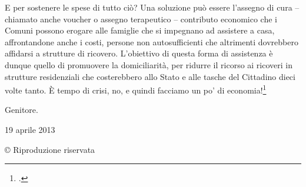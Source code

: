 E per sostenere le spese di tutto ciò? Una soluzione può essere l'assegno di cura – chiamato anche voucher o assegno terapeutico – contributo economico che i Comuni possono erogare alle famiglie che si impegnano ad assistere a casa, affrontandone anche i costi, persone non autosufficienti che altrimenti dovrebbero affidarsi a strutture di ricovero.
L'obiettivo di questa forma di assistenza è dunque quello di promuovere la domiciliarità, per ridurre il ricorso ai ricoveri in strutture residenziali che costerebbero allo Stato e alle tasche del Cittadino dieci volte tanto. È tempo di crisi, no, e quindi facciamo un po' di economia!\footcite{Felaco2013a}

Genitore.

19 aprile 2013

© Riproduzione riservata